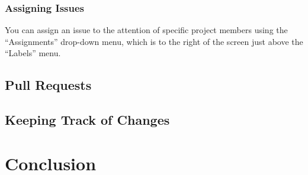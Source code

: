 \documentclass[11pt]{article}
\begin{document}


\subsubsection{Assigning Issues}

You can assign an issue to the attention of specific project members using the ``Assignments'' drop-down menu, which is to the right of the screen just above the ``Labels'' menu. 

\subsection{Pull Requests}

\subsection{Keeping Track of Changes}

\section{Conclusion}
\end{document}
